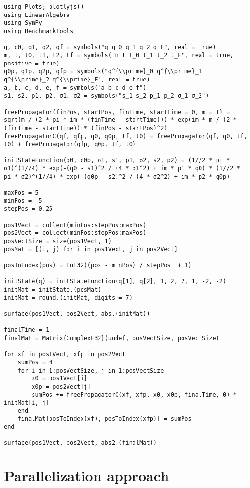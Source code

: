 \begin{verbatim}
using Plots; plotlyjs()
using LinearAlgebra
using SymPy
using BenchmarkTools

q, q0, q1, q2, qf = symbols("q q_0 q_1 q_2 q_F", real = true)
m, t, t0, t1, t2, tf = symbols("m t t_0 t_1 t_2 t_F", real = true, positive = true)
q0p, q1p, q2p, qfp = symbols("q^{\\prime}_0 q^{\\prime}_1 q^{\\prime}_2 q^{\\prime}_F", real = true)
a, b, c, d, e, f = symbols("a b c d e f")
s1, s2, p1, p2, σ1, σ2 = symbols("s_1 s_2 p_1 p_2 σ_1 σ_2")

freePropagator(finPos, startPos, finTime, startTime = 0, m = 1) = sqrt(m / (2 * pi * im * (finTime - startTime))) * exp(im * m / (2 * (finTime - startTime)) * (finPos - startPos)^2)  
freePropagatorC(qf, qfp, q0, q0p, tf, t0) = freePropagator(qf, q0, tf, t0) + freePropagator(qfp, q0p, tf, t0)

initStateFunction(q0, q0p, σ1, s1, p1, σ2, s2, p2) = (1//2 * pi * σ1)^(1//4) * exp(-(q0 - s1)^2 / (4 * σ1^2) + im * p1 * q0) * (1//2 * pi * σ2)^(1//4) * exp(-(q0p - s2)^2 / (4 * σ2^2) + im * p2 * q0p)

maxPos = 5
minPos = -5
stepPos = 0.25

pos1Vect = collect(minPos:stepPos:maxPos)
pos2Vect = collect(minPos:stepPos:maxPos)
posVectSize = size(pos1Vect, 1)
posMat = [(i, j) for i in pos1Vect, j in pos2Vect]

posToIndex(pos) = Int32((pos - minPos) / stepPos  + 1)

initState(q) = initStateFunction(q[1], q[2], 1, 2, 2, 1, -2, -2)
initMat = initState.(posMat)
initMat = round.(initMat, digits = 7)

surface(pos1Vect, pos2Vect, abs.(initMat))

finalTime = 1
finalMat = Matrix{ComplexF32}(undef, posVectSize, posVectSize)

for xf in pos1Vect, xfp in pos2Vect
    sumPos = 0
    for i in 1:posVectSize, j in 1:posVectSize
        x0 = pos1Vect[i]
        x0p = pos2Vect[j]
        sumPos += freePropagatorC(xf, xfp, x0, x0p, finalTime, 0) * initMat[i, j]
    end
    finalMat[posToIndex(xf), posToIndex(xfp)] = sumPos
end

surface(pos1Vect, pos2Vect, abs2.(finalMat))
\end{verbatim}

\section{Parallelization approach}